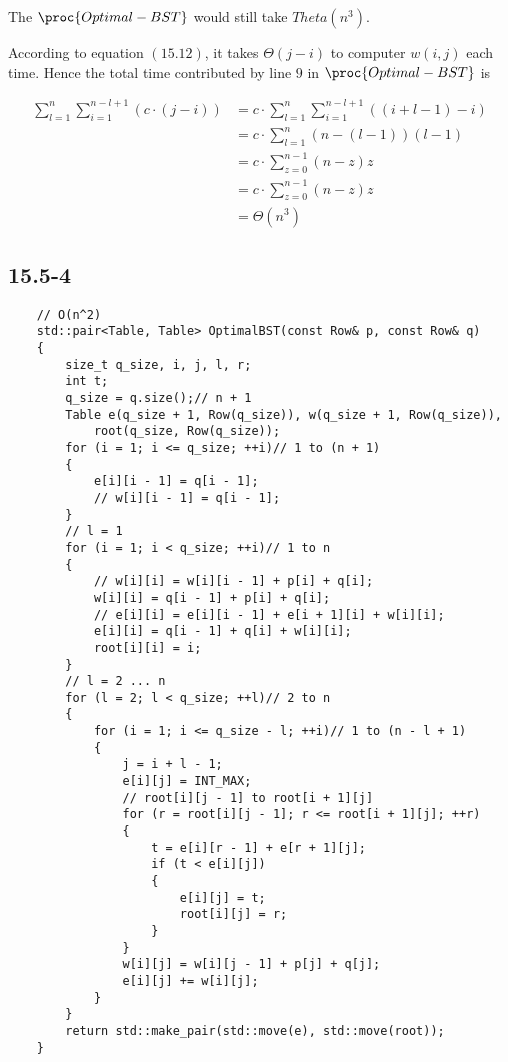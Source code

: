 \noindent
The $\proc{Optimal-BST}$ would still take $Theta(n^3)$.

\noindent
According to equation $(15.12)$, 
it takes $\Theta(j-i)$ to computer $w(i,j)$ each time.
Hence the total time contributed by line $9$ in $\proc{Optimal-BST}$ is

\begin{equation*}
    \begin{split}
        \sum\limits_{l=1}^n\sum\limits_{i=1}^{n-l+1}(c\cdot(j-i)) 
        &= c\cdot\sum\limits_{l=1}^n\sum\limits_{i=1}^{n-l+1}((i+l-1)-i) \\
        &= c\cdot\sum\limits_{l=1}^n(n-(l-1))(l-1) \\
        &= c\cdot\sum\limits_{z=0}^{n-1}(n-z)z \\
        &= c\cdot\sum\limits_{z=0}^{n-1}(n-z)z \\
        &= \Theta(n^3)
    \end{split}
\end{equation*}

\subsection*{15.5-4}

\begin{verbatim}
    // O(n^2)
    std::pair<Table, Table> OptimalBST(const Row& p, const Row& q)
    {
        size_t q_size, i, j, l, r;
        int t;
        q_size = q.size();// n + 1
        Table e(q_size + 1, Row(q_size)), w(q_size + 1, Row(q_size)),
            root(q_size, Row(q_size));
        for (i = 1; i <= q_size; ++i)// 1 to (n + 1)
        {
            e[i][i - 1] = q[i - 1];
            // w[i][i - 1] = q[i - 1];
        }
        // l = 1
        for (i = 1; i < q_size; ++i)// 1 to n
        {
            // w[i][i] = w[i][i - 1] + p[i] + q[i];
            w[i][i] = q[i - 1] + p[i] + q[i];
            // e[i][i] = e[i][i - 1] + e[i + 1][i] + w[i][i];
            e[i][i] = q[i - 1] + q[i] + w[i][i];
            root[i][i] = i;
        }
        // l = 2 ... n
        for (l = 2; l < q_size; ++l)// 2 to n
        {
            for (i = 1; i <= q_size - l; ++i)// 1 to (n - l + 1)
            {
                j = i + l - 1;
                e[i][j] = INT_MAX;
                // root[i][j - 1] to root[i + 1][j]
                for (r = root[i][j - 1]; r <= root[i + 1][j]; ++r)
                {
                    t = e[i][r - 1] + e[r + 1][j];
                    if (t < e[i][j])
                    {
                        e[i][j] = t;
                        root[i][j] = r;
                    }
                }
                w[i][j] = w[i][j - 1] + p[j] + q[j];
                e[i][j] += w[i][j];
            }
        }
        return std::make_pair(std::move(e), std::move(root));
    }
\end{verbatim}

